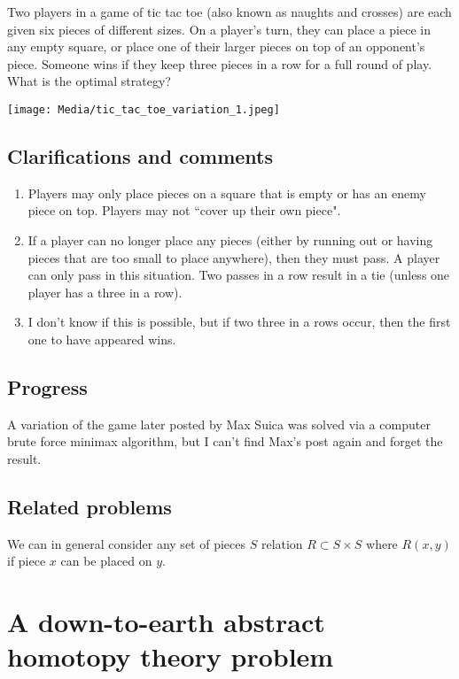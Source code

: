 \documentclass[10pt]{article}
\begin{document}
Two players in a game of tic tac toe (also known as naughts and crosses) are each given six pieces of different sizes. On a player's turn, they can place a piece in any empty square, or place one of their larger pieces on top of an opponent's piece. Someone wins if they keep three pieces in a row for a full round of play. What is the optimal strategy?

\texttt{[image: Media/tic\_tac\_toe\_variation\_1.jpeg]}

\subsection{Clarifications and comments}

\begin{enumerate}
  \item Players may only place pieces on a square that is empty or has an enemy piece on top. Players may not ``cover up their own piece".
  \item If a player can no longer place any pieces (either by running out or having pieces that are too small to place anywhere), then they must pass. A player can only pass in this situation. Two passes in a row result in a tie (unless one player has a three in a row).
  \item I don't know if this is possible, but if two three in a rows occur, then the first one to have appeared wins.
\end{enumerate}

\subsection{Progress}

A variation of the game later posted by Max Suica was solved via a computer brute force minimax algorithm, but I can't find Max's post again and forget the result.

\subsection{Related problems}

We can in general consider any set of pieces $S$ relation $R\subset S\times S$ where $R(x,y)$ if piece $x$ can be placed on $y$.

\pagebreak

\section{A down-to-earth abstract homotopy theory problem}
\end{document}
